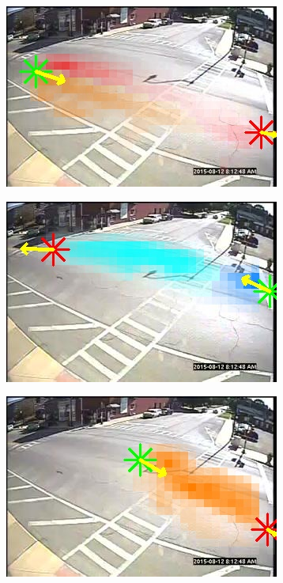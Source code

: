 \begin{figure}[!h]
    \centering
        \begin{subfigure}{0.32\linewidth}
            \includegraphics[width=\linewidth]{./img/scene_learning/res/251035/251035-0.jpg}
        \end{subfigure}
        \begin{subfigure}{0.32\linewidth}
            \includegraphics[width=\linewidth]{./img/scene_learning/res/251035/251035-1.jpg}
        \end{subfigure}
                \begin{subfigure}{0.32\linewidth}
            \includegraphics[width=\linewidth]{./img/scene_learning/res/251035/251035-2.jpg}

\end{subfigure}
\end{figure}
